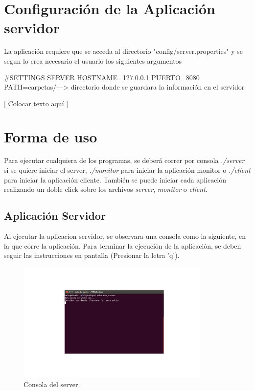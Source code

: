 \documentclass{article}
\begin{document}
\bigskip




\section{Configuración de la Aplicación servidor}
	
	La aplicación requiere que se acceda al directorio "config/server.properties" y se segun lo crea necesario el usuario 
	los siguientes argumentos

			#SETTINGS SERVER
			HOSTNAME=127.0.0.1
			PUERTO=8080
			PATH=carpetas/---> directorio donde se guardara la información en el servidor
\bigskip



[ Colocar texto aquí ]
\section{Forma de uso}
	
	Para ejecutar cualquiera de los programas, se deberá correr por consola \textit{./server} si se quiere iniciar el server, \textit{./monitor} para iniciar la aplicación monitor o \textit{./client} para iniciar la aplicación cliente. También se puede iniciar cada aplicación realizando un doble click sobre los archivos \textit{server}, \textit{monitor} o \textit{client}.

\subsection{Aplicación Servidor}
\smallskip 
	Al ejecutar la aplicacion servidor, se observara una consola como la siguiente, en la que corre la aplicación. Para terminar la ejecución de la aplicación, se deben seguir las instrucciones en pantalla (Presionar la letra 'q').	
	\begin{figure}[h]
       \centering
       \includegraphics[width=0.85\textwidth]{Server.png}
	\bigskip
       \caption{Consola del server.}
	\end{figure}
\end{document}
